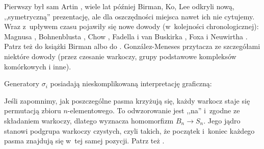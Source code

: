 Pierwszy był sam Artin \cite{artin1925}, wiele lat później Birman, Ko, Lee odkryli nową, ,,symetryczną'' prezentację, ale dla oszczędności miejsca nawet ich nie cytujemy.
%
%
%
%
Wraz z~upływem czasu pojawiły się nowe dowody (w~kolejności chronologicznej): Magnusa \cite{magnus1934}, Bohnenblusta \cite{bohnenblust1947}, Chow \cite{chow1948}, Fadella i van Buskirka \cite{fadell1962}, Foxa i Neuwirtha \cite{fox1962}.
%
%
%
%
%
%
%
Patrz też do książki Birman \cite{birman1974} albo do \cite[s. 164]{burde2014}.
González-Meneses \cite{gonzalez2011} przytacza ze szczegółami niektóre dowody (przez czesanie warkoczy, grupy podstawowe kompleksów komórkowych i inne).

Generatory $\sigma_i$ posiadają nieskomplikowaną interpretację graficzną:

Jeśli zapomnimy, jak poszczególne pasma krzyżują się, każdy warkocz staje się permutacją zbioru $n$-elementowego.
To odwzorowanie jest ,,na'' i~zgodne ze składaniem warkoczy, dlatego wyznacza homomorfizm $B_n \to S_n$.
%
Jego jądro stanowi podgrupa warkoczy czystych, czyli takich, że początek i~koniec każdego pasma znajdują się w~tej samej pozycji.
Patrz też \cite[s. 170]{burde2014}. %

